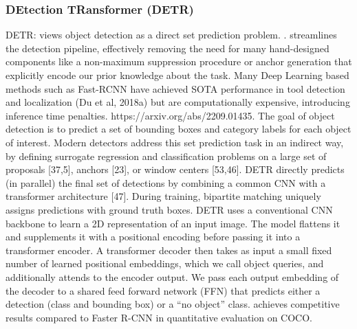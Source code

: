 
\subsubsection{DEtection TRansformer (DETR)}

DETR: views object detection as a direct set prediction problem. \cite{vedaldi_end--end_2020}. streamlines the detection pipeline, effectively removing the need for many hand-designed components like a non-maximum suppression procedure or anchor generation that explicitly encode our prior knowledge about the task.
Many Deep Learning based methods such as Fast-RCNN have achieved SOTA performance in tool detection and localization (Du et al, 2018a) but are computationally expensive, introducing inference time penalties. https://arxiv.org/abs/2209.01435.
The goal of object detection is to predict a set of bounding boxes and category labels for each object of interest. Modern detectors address this set prediction task in an indirect way, by defining surrogate regression and classification problems on a large set of proposals [37,5], anchors [23], or window centers [53,46].
DETR directly predicts (in parallel) the final set of detections by combining a common CNN with a transformer architecture [47]. During training, bipartite matching uniquely assigns predictions with ground truth boxes. 
DETR uses a conventional CNN backbone to learn a 2D representation of an input image. The model flattens it and supplements it with a positional encoding before passing it into a transformer encoder. A transformer decoder then takes as input a small fixed number of learned positional embeddings, which we call object queries, and additionally attends to the encoder output. We pass each output embedding of the decoder to a shared feed forward network (FFN) that predicts either a detection (class and bounding box) or a “no object” class.
achieves competitive results compared to Faster R-CNN in quantitative evaluation on COCO.

